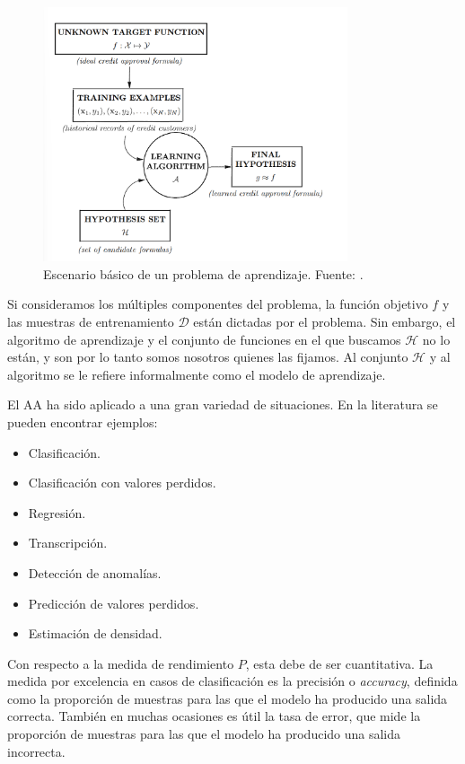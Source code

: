 \begin{figure}[!h]
    \centering
    \includegraphics[width=0.8\textwidth]{figuras/learning.png}
    \caption{Escenario básico de un problema de aprendizaje. Fuente: \cite{learningfromdata}.}
    \label{fig:learningsetup}
\end{figure}

Si consideramos los múltiples componentes del problema, la función objetivo $f$ y las muestras de entrenamiento $\mathcal{D}$ están dictadas por el problema. Sin embargo, el algoritmo de aprendizaje y el conjunto de funciones en el que buscamos $\mathcal{H}$ no lo están, y son por lo tanto somos nosotros quienes las fijamos. Al conjunto $\mathcal{H}$ y al algoritmo se le refiere informalmente como el modelo de aprendizaje.

El \ac{AA} ha sido aplicado a una gran variedad de situaciones. En la literatura se pueden encontrar ejemplos:
\begin{itemize}
    \item Clasificación.
    \item Clasificación con valores perdidos.
    \item Regresión.
    \item Transcripción.
    \item Detección de anomalías.
    \item Predicción de valores perdidos.
    \item Estimación de densidad.
\end{itemize}

Con respecto a la medida de rendimiento $P$, esta debe de ser cuantitativa. La medida por excelencia en casos de clasificación es la precisión o \textit{accuracy}, definida como la proporción de muestras para las que el modelo ha producido una salida correcta. También en muchas ocasiones es útil la tasa de error, que mide la proporción de muestras para las que el modelo ha producido una salida incorrecta.

